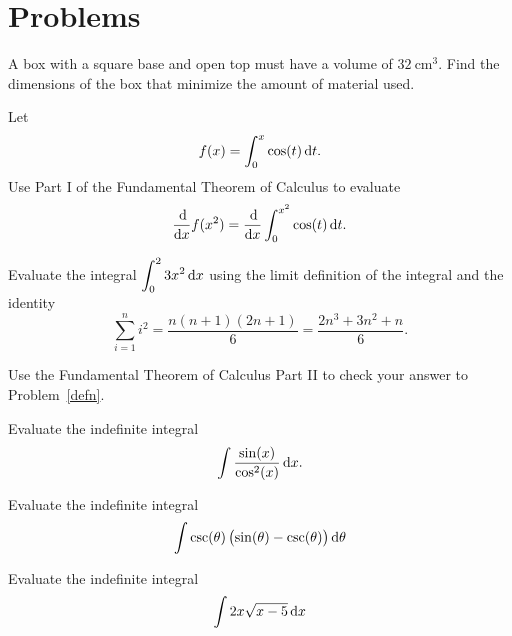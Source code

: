 \documentclass[12pt]{amsart}
\begin{document}
\section*{Problems}
\begin{thm}[10 Points]
  A box with a square base and open top must have a volume of \(32\ \text{cm}^3\).
  Find the dimensions of the box that minimize the amount of material used.\\
\end{thm}

\vspace{3in}

\begin{thm}[10 Points]
  Let
  \[f(x) = \int_0^x \cos(t)\dif t.\]
  Use Part I of the Fundamental Theorem of Calculus to evaluate
  \[\frac{\dif}{\dif x} f(x^2) = \frac{\dif}{\dif x} \int_0^{x^2} \cos(t)\dif t.\]

\end{thm}

\newpage

\begin{thm}[10 Points]\label{defn}
  Evaluate the integral \(\displaystyle{\int_0^2 3x^2 \dif x}\) using the limit definition of the integral and the identity
  \[\sum_{i = 1}^n i^2 = \frac{n(n+1)(2n + 1)}{6} = \frac{2n^3 + 3n^2 + n}{6}.\]
\end{thm}

\vspace{5in}

\begin{thm}[10 Points]
  Use the Fundamental Theorem of Calculus Part II to check your answer to Problem~\ref{defn}.
\end{thm}

\newpage

\begin{thm}[10 Points]
  Evaluate the indefinite integral
  \[\int\frac{\sin(x)}{\cos^2(x)}\dif x.\]
\end{thm}

\vspace{3in}

\begin{thm}[10 Points]
  Evaluate the indefinite integral
  \[\int \csc(\theta)\left(\sin(\theta) - \csc(\theta)\right)\dif \theta\]
\end{thm}

\newpage

\begin{thm}[10 Points]
  Evaluate the indefinite integral
  \[\int 2x\sqrt{x - 5}\dif x\]
\end{thm}
\end{document}
